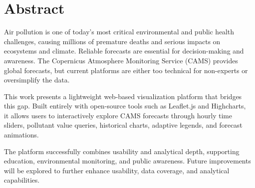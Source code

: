 \thispagestyle{empty}

\chapter*{Abstract}
Air pollution is one of today’s most critical environmental and public health challenges, causing millions of premature deaths and serious impacts on ecosystems and climate. Reliable forecasts are essential for decision-making and awareness. The Copernicus Atmosphere Monitoring Service (CAMS) provides global forecasts, but current platforms are either too technical for non-experts or oversimplify the data.

This work presents a lightweight web-based visualization platform that bridges this gap. Built entirely with open-source tools such as Leaflet.js and Highcharts, it allows users to interactively explore CAMS forecasts through hourly time sliders, pollutant value queries, historical charts, adaptive legends, and forecast animations.

The platform successfully combines usability and analytical depth, supporting education, environmental monitoring, and public awareness. Future improvements will be explored to further enhance usability, data coverage, and analytical capabilities.




\clearpage
\thispagestyle{empty}
\hfill
\clearpage